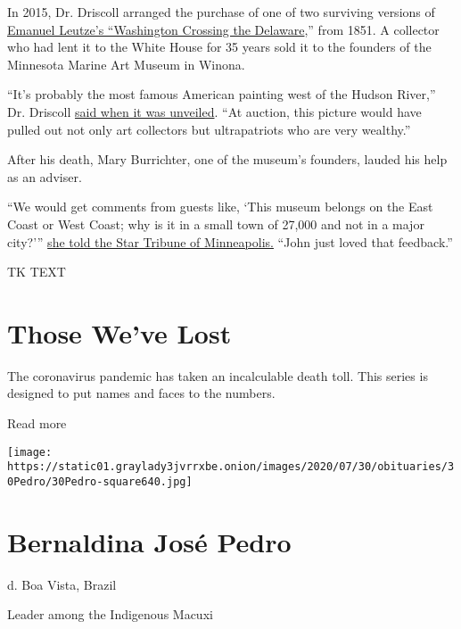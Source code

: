 In 2015, Dr. Driscoll arranged the purchase of one of two surviving
versions of \href{https://www.mmam.org/collections}{Emanuel Leutze's
``Washington Crossing the Delaware},'' from 1851. A collector who had
lent it to the White House for 35 years sold it to the founders of the
Minnesota Marine Art Museum in Winona.

``It's probably the most famous American painting west of the Hudson
River,'' Dr. Driscoll
\href{https://www.startribune.com/washington-crossing-the-delaware-lands-in-winona-museum/297329091/}{said
when it was unveiled}. ``At auction, this picture would have pulled out
not only art collectors but ultrapatriots who are very wealthy.''

After his death, Mary Burrichter, one of the museum's founders, lauded
his help as an adviser.

``We would get comments from guests like, `This museum belongs on the
East Coast or West Coast; why is it in a small town of 27,000 and not in
a major city?'''
\href{https://www.startribune.com/minnesota-born-art-scholar-john-driscoll-dies-of-covid-19-complications/569964762/}{she
told the Star Tribune of Minneapolis.} ``John just loved that
feedback.''

TK TEXT

\href{https://www.nytimes3xbfgragh.onion/interactive/2020/obituaries/people-died-coronavirus-obituaries.html?action=click\&pgtype=Article\&state=default\&region=BELOW_MAIN_CONTENT\&context=covid_obits_promo}{}

\hypertarget{those-weve-lost}{%
\section{Those We've Lost}\label{those-weve-lost}}

The coronavirus pandemic has taken an incalculable death toll. This
series is designed to put names and faces to the numbers.

Read more

\texttt{[image: https://static01.graylady3jvrrxbe.onion/images/2020/07/30/obituaries/30Pedro/30Pedro-square640.jpg]}

\hypertarget{bernaldina-josuxe9-pedro}{%
\section{Bernaldina José Pedro}\label{bernaldina-josuxe9-pedro}}

d. Boa Vista, Brazil

Leader among the Indigenous Macuxi

